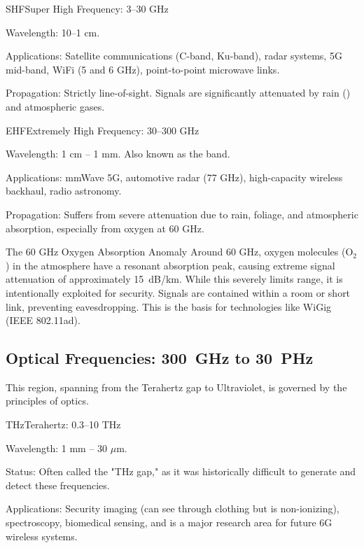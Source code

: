 \begin{spectrumband}{SHF}{Super High Frequency: 3--30 GHz}
    \item[Wavelength:] 10--1 cm.
    \item[Applications:] Satellite communications (C-band, Ku-band), radar systems, 5G mid-band, WiFi (5 and 6 GHz), point-to-point microwave links.
    \item[Propagation:] Strictly line-of-sight. Signals are significantly attenuated by rain () and atmospheric gases.
\end{spectrumband}

\begin{spectrumband}{EHF}{Extremely High Frequency: 30--300 GHz}
    \item[Wavelength:] 1 cm -- 1 mm. Also known as the  band.
    \item[Applications:] mmWave 5G, automotive radar (77 GHz), high-capacity wireless backhaul, radio astronomy.
    \item[Propagation:] Suffers from severe attenuation due to rain, foliage, and atmospheric absorption, especially from oxygen at 60 GHz.
\end{spectrumband}

\begin{calloutbox}{The 60 GHz Oxygen Absorption Anomaly}
    Around 60 GHz, oxygen molecules (O$_2$) in the atmosphere have a resonant absorption peak, causing extreme signal attenuation of approximately \qty{15}{dB/km}. While this severely limits range, it is intentionally exploited for security. Signals are contained within a room or short link, preventing eavesdropping. This is the basis for technologies like WiGig (IEEE 802.11ad).
\end{calloutbox}

\subsection{Optical Frequencies: \qty{300}{GHz} to \qty{30}{PHz}}

This region, spanning from the Terahertz gap to Ultraviolet, is governed by the principles of optics.

\begin{spectrumband}{THz}{Terahertz: 0.3--10 THz}
    \item[Wavelength:] 1 mm -- 30 $\mu$m.
    \item[Status:] Often called the "THz gap," as it was historically difficult to generate and detect these frequencies.
    \item[Applications:] Security imaging (can see through clothing but is non-ionizing), spectroscopy, biomedical sensing, and is a major research area for future 6G wireless systems.
\end{spectrumband}


